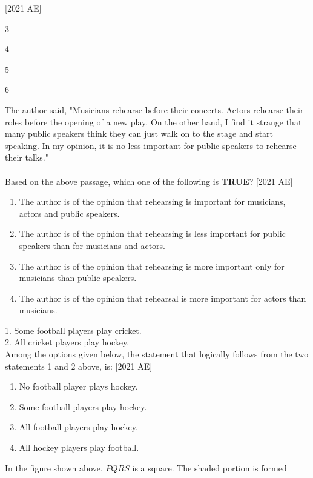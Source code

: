 \hfill [2021 AE]
\begin{enumerate}
    \begin{multicols}{4}
        \item 3
        \item 4
        \item 5
        \item 6
    \end{multicols}
\end{enumerate}
\item The author said, "Musicians rehearse before their concerts. Actors rehearse
their roles before the opening of a new play. On the other hand, I find it
strange that many public speakers think they can just walk on to the stage
and start speaking. In my opinion, it is no less important for public speakers
to rehearse their talks." \\ \\ Based on the above passage, which one of the following is \textbf{TRUE}? \hfill[2021 AE]
\begin{enumerate}
    \item The author is of the opinion that rehearsing is important for musicians, actors
and public speakers.
\item The author is of the opinion that rehearsing is less important for public speakers
than for musicians and actors.
\item The author is of the opinion that rehearsing is more important only for
musicians than public speakers.
\item The author is of the opinion that rehearsal is more important for actors than
musicians.
\end{enumerate}
\item 1. Some football players play cricket.\\
2. All cricket players play hockey. \\ 
Among the options given below, the statement that logically follows from the two statements 1 and 2 above, is: \hfill [2021 AE]
\begin{enumerate}
    \item No football player plays hockey.
    \item Some football players play hockey.
    \item All football players play hockey.
    \item All hockey players play football.
\end{enumerate}
\item 
In the figure shown above, $PQRS$ is a square. The shaded portion is formed
